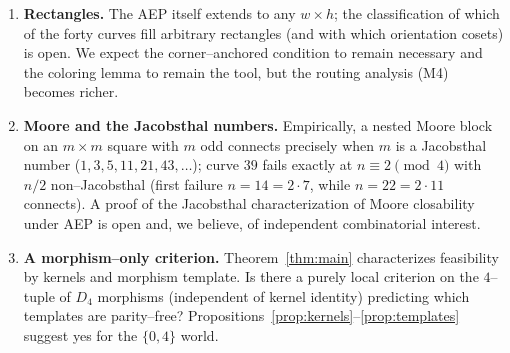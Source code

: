 \documentclass[11pt]{article}
\theoremstyle{definition}
\newcommand{\Dfour}{D_4}
\begin{document}
\begin{enumerate}[leftmargin=*]
\item \textbf{Rectangles.} The AEP itself extends to any $w\times h$; the classification of
which of the forty curves fill arbitrary rectangles (and with which orientation cosets) is
open. We expect the corner--anchored condition to remain necessary and the coloring lemma to
remain the tool, but the routing analysis (M4) becomes richer.
\item \textbf{Moore and the Jacobsthal numbers.} Empirically, a nested Moore block on an
$m\times m$ square with $m$ odd connects precisely when $m$ is a Jacobsthal number
($1,3,5,11,21,43,\dots$); curve $39$ fails exactly at $n\equiv2\pmod4$ with $n/2$
non--Jacobsthal (first failure $n=14=2\cdot7$, while $n=22=2\cdot11$ connects). A proof of
the Jacobsthal characterization of Moore closability under AEP is open and, we believe, of
independent combinatorial interest.
\item \textbf{A morphism--only criterion.} Theorem~\ref{thm:main} characterizes feasibility
by kernels and morphism template. Is there a purely local criterion on the $4$--tuple of
$\Dfour$ morphisms (independent of kernel identity) predicting which templates are
parity--free? Propositions~\ref{prop:kernels}--\ref{prop:templates} suggest yes for the
$\{0,4\}$ world.
\end{enumerate}

\appendix
\end{document}
